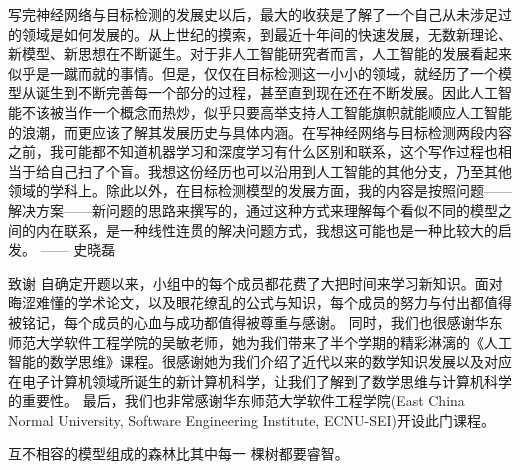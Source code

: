 写完神经网络与目标检测的发展史以后，最大的收获是了解了一个自己从未涉足过的领域是如何发展的。从上世纪的摸索，到最近十年间的快速发展，无数新理论、新模型、新思想在不断诞生。对于非人工智能研究者而言，人工智能的发展看起来似乎是一蹴而就的事情。但是，仅仅在目标检测这一小小的领域，就经历了一个模型从诞生到不断完善每一个部分的过程，甚至直到现在还在不断发展。因此人工智能不该被当作一个概念而热炒，似乎只要高举支持人工智能旗帜就能顺应人工智能的浪潮，而更应该了解其发展历史与具体内涵。在写神经网络与目标检测两段内容之前，我可能都不知道机器学习和深度学习有什么区别和联系，这个写作过程也相当于给自己扫了个盲。我想这份经历也可以沿用到人工智能的其他分支，乃至其他领域的学科上。除此以外，在目标检测模型的发展方面，我的内容是按照问题——解决方案——新问题的思路来撰写的，通过这种方式来理解每个看似不同的模型之间的内在联系，是一种线性连贯的解决问题方式，我想这可能也是一种比较大的启发。
—— 史晓磊

致谢
自确定开题以来，小组中的每个成员都花费了大把时间来学习新知识。面对晦涩难懂的学术论文，以及眼花缭乱的公式与知识，每个成员的努力与付出都值得被铭记，每个成员的心血与成功都值得被尊重与感谢。
同时，我们也很感谢华东师范大学软件工程学院的吴敏老师，她为我们带来了半个学期的精彩淋漓的《人工智能的数学思维》课程。很感谢她为我们介绍了近代以来的数学知识发展以及对应在电子计算机领域所诞生的新计算机科学，让我们了解到了数学思维与计算机科学的重要性。
最后，我们也非常感谢华东师范大学软件工程学院(East China Normal University, Software Engineering Institute, ECNU-SEI)开设此门课程。 

互不相容的模型组成的森林比其中每一 棵树都要睿智。

